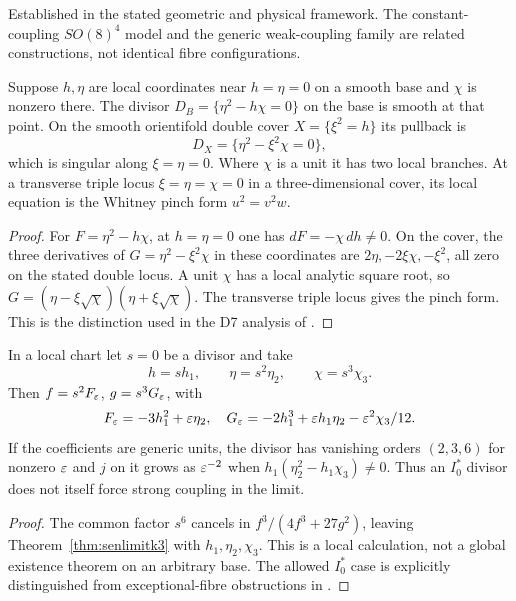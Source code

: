 \begin{verdict}[claim 22]
Established in the stated geometric and physical framework. The constant-coupling $SO(8)^4$ model and the generic weak-coupling family are related constructions, not identical fibre configurations.
\end{verdict}

\begin{proposition}\label{prop:senlimitcy}
Suppose $h,\eta$ are local coordinates near $h=\eta=0$ on a smooth base and $\chi$ is nonzero there. The divisor $D_B=\{\eta^2-h\chi=0\}$ on the base is smooth at that point. On the smooth orientifold double cover $X=\{\xi^2=h\}$ its pullback is
\[
D_X=\{\eta^2-\xi^2\chi=0\},
\]
which is singular along $\xi=\eta=0$. Where $\chi$ is a unit it has two local branches. At a transverse triple locus $\xi=\eta=\chi=0$ in a three-dimensional cover, its local equation is the Whitney pinch form $u^2=v^2w$.
\end{proposition}
\begin{proof}
For $F=\eta^2-h\chi$, at $h=\eta=0$ one has $dF=-\chi\,dh\ne0$. On the cover, the three derivatives of $G=\eta^2-\xi^2\chi$ in these coordinates are $2\eta,-2\xi\chi,-\xi^2$, all zero on the stated double locus. A unit $\chi$ has a local analytic square root, so $G=(\eta-\xi\sqrt\chi)(\eta+\xi\sqrt\chi)$. The transverse triple locus gives the pinch form. This is the distinction used in the D7 analysis of \cite{CDE09}.
\end{proof}

\begin{proposition}\label{prop:i0star}
In a local chart let $s=0$ be a divisor and take
\[
h=s h_1,\qquad\eta=s^2\eta_2,\qquad\chi=s^3\chi_3.
\]
Then $f=s^2F_\varepsilon$, $g=s^3G_\varepsilon$, with
\[
F_\varepsilon=-3h_1^2+\varepsilon\eta_2,\quad
G_\varepsilon=-2h_1^3+\varepsilon h_1\eta_2-\varepsilon^2\chi_3/12.
\]
If the coefficients are generic units, the divisor has vanishing orders $(2,3,6)$ for nonzero $\varepsilon$ and $j$ on it grows as $\varepsilon^{-2}$ when $h_1(\eta_2^2-h_1\chi_3)\ne0$. Thus an $I_0^*$ divisor does not itself force strong coupling in the limit.
\end{proposition}
\begin{proof}
The common factor $s^6$ cancels in $f^3/(4f^3+27g^2)$, leaving Theorem~\ref{thm:senlimitk3} with $h_1,\eta_2,\chi_3$. This is a local calculation, not a global existence theorem on an arbitrary base. The allowed $I_0^*$ case is explicitly distinguished from exceptional-fibre obstructions in \cite{HLS18}.
\end{proof}

